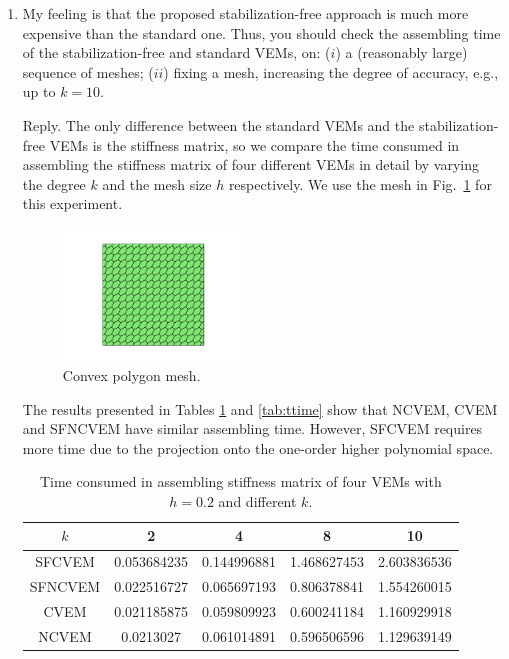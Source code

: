 \documentclass[10pt]{amsart}
\theoremstyle{definition}
\theoremstyle{remark}
\begin{document}
\begin{enumerate}[1.]
\medskip

\item \textsf{My feeling is that the proposed stabilization-free approach is much more expensive than the standard one. Thus, you should check the assembling time of the stabilization-free and standard VEMs, on: ($i$) a (reasonably large) sequence of meshes; ($ii$) fixing a mesh, increasing the degree of accuracy, e.g., up to $k = 10$.}

\smallskip \noindent \textcolor[rgb]{1.00,0.00,0.00}{Reply.}
The only difference between the standard VEMs and the stabilization-free VEMs is the
stiffness matrix, so we compare the time consumed in assembling the stiffness matrix of
four different VEMs in detail by varying the degree $k$ and the mesh size $h$
respectively. We use the mesh in Fig.~\ref{fig:mesh} for this experiment.
\begin{figure}[htbp]
\centering
\includegraphics*[width=4.7cm]{../figures/convex.pdf}
\caption{Convex polygon mesh.}
\label{fig:mesh}
\end{figure}
The results presented in Tables
\ref{tab:ptime} and \ref{tab:ttime} show that NCVEM, CVEM and SFNCVEM have similar assembling time. 
However, SFCVEM requires more time due to the projection onto the one-order higher polynomial space.
\begin{table}[htbp]
\caption{Time consumed in assembling stiffness matrix of four VEMs with
 $h=0.2$ and different $k$.}
\label{tab:ptime}
\centering
\begin{tabular}{c|cccc}
\hline
$k$ & 2 & 4 & 8 & 10 \\
\hline
SFCVEM & 0.053684235 & 0.144996881 & 1.468627453 & 2.603836536 \\
SFNCVEM & 0.022516727 & 0.065697193 & 0.806378841 & 1.554260015 \\
CVEM & 0.021185875 & 0.059809923 & 0.600241184 & 1.160929918 \\
NCVEM & 0.0213027 & 0.061014891 & 0.596506596 & 1.129639149 \\
\hline
\end{tabular}
\end{table}
\begin{table}[htbp]

\end{table}
\end{enumerate}
\end{document}
